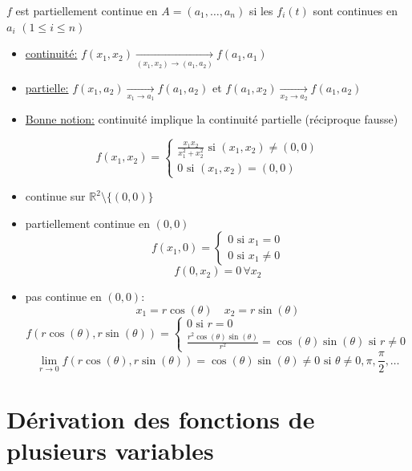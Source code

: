 \documentclass[a4paper]{report}
\newcommand\R{\ensuremath{\mathbb{R}}}
\theoremstyle{definition}
\begin{document}
\begin{definition}
    $f$ est partiellement continue en  $A = (a_1, \ldots, a_n)$ si les $f_i(t)$ sont continues en  $a_i$ $(1 \le i \le n)$
\end{definition}
\begin{itemize}
    \item 
\underline{continuité:} $f(x_1, x_2) \xrightarrow[(x_1, x_2) \to (a_1, a_2)]{}  f(a_1, a_1)$  
    \item 
\underline{partielle:} $f(x_1, a_2) \xrightarrow[x_1 \to a_1]{}   f(a_1, a_2)$ et $f(a_1, x_2) \xrightarrow[x_2 \to a_2]{}  f(a_1, a_2)$
    \item 
\underline{Bonne notion:} continuité implique la continuité partielle (réciproque fausse)
\end{itemize}
\begin{eg}
\[
f(x_1, x_2) = \begin{cases}
    \frac{x_1x_2}{x_1^2 + x_2^2} \text{ si } (x_1, x_2) \neq (0, 0)\\
    0 \text{ si } (x_1, x_2)=(0, 0)
\end{cases}
\]     
\begin{itemize}
    \item continue sur $\R^2 \setminus \{(0, 0)\}$
    \item partiellement continue en $(0, 0)$
         \[
        f(x_1, 0) = \begin{cases}
            0 \text{ si } x_1 = 0\\
            0 \text{ si } x_1 \neq 0
        \end{cases}
        \] 
        \[
        f(0, x_2) = 0 \, \forall x_2
        \] 
    \item pas continue en $(0, 0)$:
         \[
        x_1 = r \cos(\theta) \quad x_2 = r \sin(\theta)
        \] 
        \[
        f(r\cos(\theta), r\sin(\theta)) = \begin{cases}
            0 \text{ si } r = 0\\
            \frac{r^2\cos(\theta)\sin(\theta)}{r^2} = \cos(\theta)\sin(\theta) \text{ si } r \neq 0
        \end{cases}
        \] 
        \[
        \lim_{r \to 0} f(r\cos(\theta), r\sin(\theta)) = \cos(\theta)\sin(\theta) \neq 0 \text{ si } \theta \neq 0, \pi, \frac{\pi}{2}, \ldots
        \] 
\end{itemize}
\end{eg}



\chapter{Dérivation des fonctions de plusieurs variables}
\end{document}

